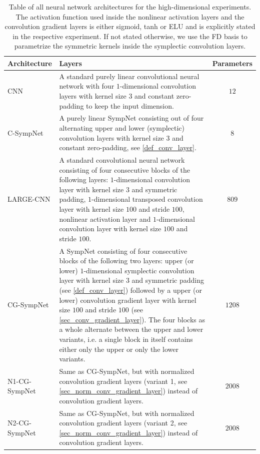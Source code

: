 \documentclass[twoside,a4paper]{article}
\begin{document}
\begin{table}
	\centering
	\begin{tabular}{lp{8cm}c}
		\toprule Architecture & Layers & Parameters \\
		\midrule CNN & 
		A standard purely linear convolutional neural network with four $1$-dimensional
		convolution layers with kernel size $3$ and constant zero-padding to keep the input dimension. 
		& $12$ \\
		C-SympNet & A purely linear SympNet consisting out of four alternating upper and lower
		(symplectic) convolution layers with kernel size $3$ and constant zero-padding,
		see \cref{def_conv_layer}. 
		& $8$ \\
		LARGE-CNN &
		A standard convolutional neural network consisting of four consecutive blocks of
		the following layers: $1$-dimensional convolution layer with kernel size $3$
		and symmetric padding, $1$-dimensional transposed convolution layer
		with kernel size $100$ and stride $100$, nonlinear activation layer
		and $1$-dimensional convolution layer with kernel size $100$ and stride $100$. 
		& $809$ \\
		CG-SympNet & 
		A SympNet consisting of four consecutive blocks of
		the following two layers: upper (or lower) $1$-dimensional symplectic convolution layer with
		kernel size $3$ and symmetric padding (see \cref{def_conv_layer}) 
		followed by a upper (or lower) convolution gradient layer
		with kernel size $100$ and stride $100$ (see \cref{sec_conv_gradient_layer}). 
		The four blocks as a whole alternate between
		the upper and lower variants, i.e. a single block in itself contains either only the upper or only
		the lower variants. 
		& $1208$ \\
		N1-CG-SympNet & Same as CG-SympNet, but with normalized convolution gradient layers
		(variant 1, see \cref{sec_norm_conv_gradient_layer}) instead of convolution gradient layers.
		& $2008$ \\
		N2-CG-SympNet & Same as CG-SympNet, but with normalized convolution gradient layers
		(variant 2, see \cref{sec_norm_conv_gradient_layer}) instead of convolution gradient layers.
		& $2008$ \\ \bottomrule
	\end{tabular}
	\caption{Table of all neural network architectures for the
	high-dimensional experiments. The activation function used inside the nonlinear activation layers
	and the convolution gradient layers is either sigmoid, tanh or ELU and is explicitly stated
	in the respective experiment.
	If not stated otherwise, we use the FD basis to parametrize the symmetric kernels 
	inside the symplectic convolution layers.}\label{table_high_dim_arch}
\end{table}
\end{document}
